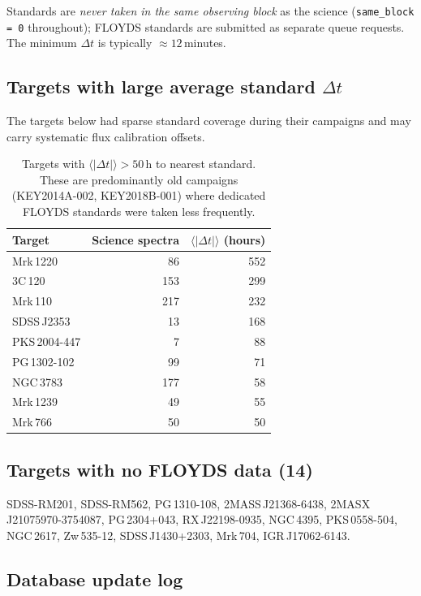 \documentclass[12pt,a4paper]{article}
\begin{document}
Standards are \emph{never taken in the same observing block} as the science
(\texttt{same\_block = 0} throughout); FLOYDS standards are submitted as
separate queue requests.  The minimum $\Delta t$ is typically $\approx
12$\,minutes.

\subsection{Targets with large average standard $\Delta t$}
\label{sec:std-dt}

The targets below had sparse standard coverage during their campaigns and
may carry systematic flux calibration offsets.

\begin{table}[h!]
\centering
\small
\begin{tabular}{lrr}
\toprule
Target & Science spectra & $\langle|\Delta t|\rangle$ (hours) \\
\midrule
Mrk\,1220      &  86 & 552 \\
3C\,120        & 153 & 299 \\
Mrk\,110       & 217 & 232 \\
SDSS\,J2353    &  13 & 168 \\
PKS\,2004-447  &   7 &  88 \\
PG\,1302-102   &  99 &  71 \\
NGC\,3783      & 177 &  58 \\
Mrk\,1239      &  49 &  55 \\
Mrk\,766       &  50 &  50 \\
\bottomrule
\end{tabular}
\caption{Targets with $\langle|\Delta t|\rangle > 50$\,h to nearest standard.
  These are predominantly old campaigns (KEY2014A-002, KEY2018B-001) where
  dedicated FLOYDS standards were taken less frequently.}
\end{table}

\subsection{Targets with no FLOYDS data (14)}

SDSS-RM201, SDSS-RM562, PG\,1310-108, 2MASS\,J21368-6438,
2MASX\,J21075970-3754087, PG\,2304+043, RX\,J22198-0935, NGC\,4395,
PKS\,0558-504, NGC\,2617, Zw\,535-12, SDSS\,J1430+2303, Mrk\,704,
IGR\,J17062-6143.

\subsection{Database update log}
\end{document}
